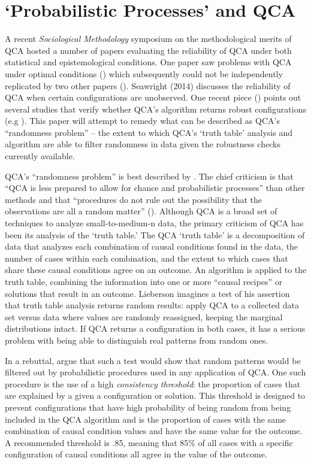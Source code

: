 \documentclass[12pt]{article}
\begin{document}
{{{{\section{`Probabilistic Processes' and QCA}


A recent {\it{Sociological Methodology}} symposium on the methodological merits of QCA hosted a number of papers evaluating the reliability of QCA under both statistical and epistemological conditions. One paper saw problems with QCA under optimal conditions (\citealt{lucas_and_szatrowski_2014}) which subsequently could not be independently replicated by two other papers (\citealt{ragin_2014,vaisey_2014}). Seawright (2014) discusses the reliability of QCA when certain configurations are unobserved. One recent piece (\citealt{collier_2014}) points out several studies that verify whether QCA's algorithm returns robust configurations (e.g \citealt{hug_2013,schneider_and_wagemann_2012,krogslund_et_al_2015}). This paper will attempt to remedy what can be described as QCA's ``randomness problem'' -- the extent to which QCA's `truth table' analysis and algorithm are able to filter randomness in data given the robustness checks currently available. 

QCA's ``randomness problem'' is best described by \citet{lieberson_2004}. The chief criticism is that ``QCA is less prepared to allow for chance and probabilistic processes'' than other methods and that ``procedures do not rule out the possibility that the observations are all a random matter'' (\citealt[13]{lieberson_2004}). Although QCA is a broad set of techniques to analyze small-to-medium-n data, the primary criticism of QCA has been its analysis of the `truth table.' The QCA `truth table' is a decomposition of data that analyzes each combination of causal conditions found in the data, the number of cases within each combination, and the extent to which cases that share these causal conditions agree on an outcome. An algorithm is applied to the truth table, combining the information into one or more ``causal recipes'' or solutions that result in an outcome. Lieberson imagines a test of his assertion that truth table analysis returns random results: apply QCA to a collected data set versus data where values are randomly reassigned, keeping the marginal distributions intact. If QCA returns a configuration in both cases, it has a serious problem with being able to distinguish real patterns from random ones.

In a rebuttal, \citet{rihoux_and_ragin_2009} argue that such a test would show that random patterns would be filtered out by probabilistic procedures used in any application of QCA. One such procedure is the use of a high {\it{consistency threshold}}: the proportion of cases that are explained by a given a configuration or solution. This threshold is designed to prevent configurations that have high probability of being random from being included in the QCA algorithm and is the proportion of cases with the same combination of causal condition values and have the same value for the outcome. A recommended threshold is .85, meaning that 85\% of all cases with a specific configuration of causal conditions all agree in the value of the outcome. 

}}}}
\end{document}
